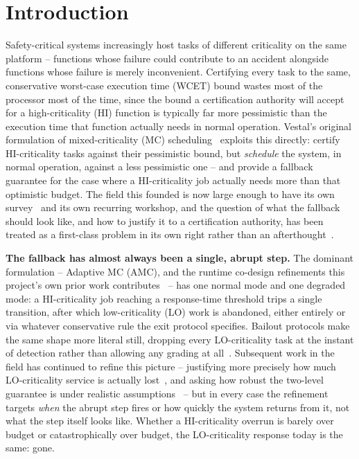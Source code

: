 \documentclass{article}
\begin{document}
\section{Introduction}
\label{sec:introduction}

Safety-critical systems increasingly host tasks of different criticality on the same platform --
functions whose failure could contribute to an accident alongside functions whose failure is
merely inconvenient. Certifying every task to the same, conservative worst-case execution time
(WCET) bound wastes most of the processor most of the time, since the bound a certification
authority will accept for a high-criticality (HI) function is typically far more pessimistic than
the execution time that function actually needs in normal operation. Vestal's original
formulation of mixed-criticality (MC) scheduling~\cite{Vestal} exploits this directly: certify
HI-criticality tasks against their pessimistic bound, but \emph{schedule} the system, in normal
operation, against a less pessimistic one -- and provide a fallback guarantee for the case where
a HI-criticality job actually needs more than that optimistic budget. The field this founded is
now large enough to have its own survey~\cite{MCS_survey} and its own recurring workshop, and the
question of what the fallback should look like, and how to justify it to a certification
authority, has been treated as a first-class problem in its own right rather than an
afterthought~\cite{graydon2013safetyassurance}.

\textbf{The fallback has almost always been a single, abrupt step.} The dominant formulation --
Adaptive MC (AMC), and the runtime co-design refinements this project's own prior work
contributes~\cite{9804600} -- has one normal mode and one degraded mode: a HI-criticality job
reaching a response-time threshold trips a single transition, after which low-criticality (LO)
work is abandoned, either entirely or via whatever conservative rule the exit protocol specifies.
Bailout protocols make the same shape more literal still, dropping every LO-criticality task at
the instant of detection rather than allowing any grading at
all~\cite{ecrts_bailout,tse_bailout}. Subsequent work in the field has continued to refine this
picture -- justifying more precisely how much LO-criticality service is actually
lost~\cite{rtns_2020_service}, and asking how robust the two-level guarantee is under realistic
assumptions~\cite{resilient_scheduling} -- but in every case the refinement targets \emph{when}
the abrupt step fires or how quickly the system returns from it, not what the step itself looks
like. Whether a HI-criticality overrun is barely over budget or catastrophically over budget, the
LO-criticality response today is the same: gone.
\end{document}
